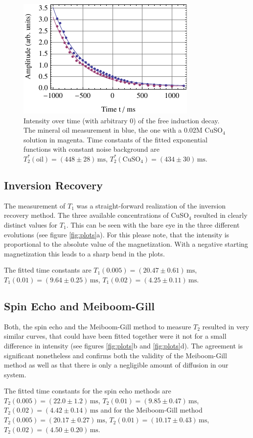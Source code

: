 \documentclass[a4paper]{scrartcl}
\numberwithin{equation}{section}
\numberwithin{figure}{section}
\numberwithin{table}{section}
\begin{document}
\begin{figure}
\centering
	\includegraphics[width=0.5\linewidth]{img/t2st.pdf}
	\caption{\small Intensity over time (with arbitrary 0) of the free induction decay. The mineral oil measurement in blue, the one with a 0.02M CuSO$_4$ solution in magenta. Time constants of the fitted exponential functions with constant noise background are $T_2^*(\text{oil})=(448\pm 28)\,\text{ms}$, $T_2^*(\text{CuSO}_4)=(434\pm 30)\,\text{ms}$. }
	\label{fig:fid}
\end{figure}

\subsection{Inversion Recovery}
The measurement of $T_1$ was a straight-forward realization of the inversion recovery method. The three available concentrations of CuSO$_4$ resulted in clearly distinct values for $T_1$. This can be seen with the bare eye in the three different evolutions (see figure \ref{fig:plots}a). For this please note, that the intensity is proportional to the absolute value of the magnetization. With a negative starting magnetization this leads to a sharp bend in the plots.

The fitted time constants are $T_1(0.005)=(20.47\pm 0.61)\,\text{ms}$, $T_1(0.01)=(9.64\pm 0.25)\,\text{ms}$, $T_1(0.02)=(4.25\pm 0.11)\,\text{ms}$.

\subsection{Spin Echo and Meiboom-Gill}
Both, the spin echo and the Meiboom-Gill method to measure $T_2$ resulted in very similar curves, that could have been fitted together were it not for a small difference in intensity (see figures \ref{fig:plots}b and \ref{fig:plots}d). The agreement is significant nonetheless and confirms both the validity of the Meiboom-Gill method as well as that there is only a negligible amount of diffusion in our system.

The fitted time constants for the spin echo methods are $T_2(0.005)=(22.0\pm 1.2)\,\text{ms}$, $T_2(0.01)=(9.85\pm 0.47)\,\text{ms}$, $T_2(0.02)=(4.42\pm 0.14)\,\text{ms}$ and for the Meiboom-Gill method $T_2(0.005)=(20.17\pm 0.27)\,\text{ms}$, $T_2(0.01)=(10.17\pm 0.43)\,\text{ms}$, $T_2(0.02)=(4.50\pm 0.20)\,\text{ms}$.
\end{document}
